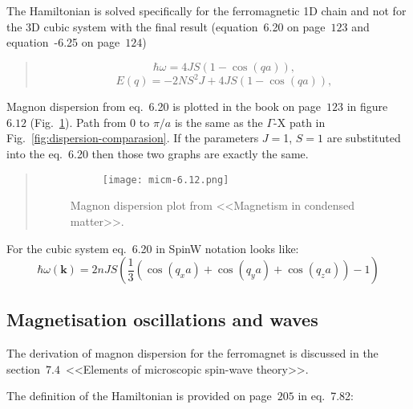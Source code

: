     The Hamiltonian is solved specifically for the ferromagnetic 1D chain and not for the 3D cubic system with the final result (equation~6.20 on page~$123$ and equation~-6.25 on page~$124$)
    \begin{quote}
        \begin{equation}
            \hbar\omega = 4JS(1 - \cos(qa)), \label{eq:micm-6.20} \tag{6.20}
        \end{equation}
        \begin{equation}
           E(q) = -2NS^2J + 4JS(1 - \cos(qa)), \label{eq:micm-6.25} \tag{6.25}
        \end{equation}
    \end{quote}
    Magnon dispersion from eq.~6.20 is plotted in the book on page~$123$ in figure~$6.12$ (Fig.~\ref{fig:micm-6.12}). 
    Path from $0$ to $\pi / a$ is the same as the $\Gamma$-X path in Fig.~\ref{fig:dispersion-comparasion}. 
    If the parameters $J = $1, $S = 1$ are substituted into the eq.~6.20 then those two graphs are exactly the same.
    \begin{quote}
        \begin{figure}[H]
            \centering
            \begin{subfigure}[b]{0.5\textwidth}
                \centering
                \texttt{[image: micm-6.12.png]}
            \end{subfigure}
            \hfill
            \caption{Magnon dispersion plot from <<Magnetism in condensed matter>>.}
            \label{fig:micm-6.12}
        \end{figure}
    \end{quote}
    For the cubic system eq.~6.20 in SpinW notation looks like:
    \begin{equation}
        \hbar\omega(\boldsymbol{k}) = 2nJS(\dfrac{1}{3}(\cos(q_xa) + \cos(q_ya) + \cos(q_za)) - 1)
    \end{equation}

\subsection{Magnetisation oscillations and waves \cite{gurevich1996magnetization}}
    The derivation of magnon dispersion for the ferromagnet is discussed in the section~$7.4$~<<Elements of microscopic spin-wave theory>>.

    The definition of the Hamiltonian is provided on page~$205$ in eq.~7.82:

